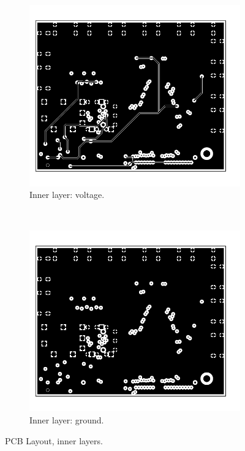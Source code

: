 \documentclass[main.tex]{subfiles}
\begin{document}
\begin{figure}[]
    \centering
    \begin{subfigure}[t]{0.5\textwidth}
        \centering
        \includegraphics[width=\linewidth, angle=0]{../img/pcb_in1}
        \caption{Inner layer: voltage.}
    \end{subfigure}%
    \\
    \begin{subfigure}[t]{0.5\textwidth}
        \centering
        \includegraphics[width=\linewidth, angle=0]{../img/pcb_in2}
        \caption{Inner layer: ground.}
    \end{subfigure}
    \caption{PCB Layout, inner layers.}
    \label{fig:pcb_in}
\end{figure}
\end{document}
